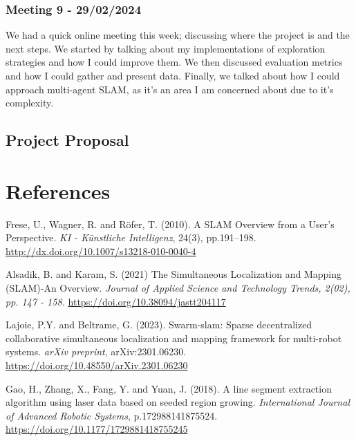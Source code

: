 \documentclass[12pt]{article}
\begin{document}
\subsubsection{Meeting 9 - 29/02/2024}
We had a quick online meeting this week; discussing where the project is and the next steps. We started by talking about
my implementations of exploration strategies and how I could improve them. We then discussed evaluation metrics and how I
could gather and present data. Finally, we talked about how I could approach multi-agent SLAM, as it's an area I am concerned
about due to it's complexity.

\subsection{Project Proposal}


\section{References}

\begin{thebibliography}{9}

    Frese, U., Wagner, R. and Röfer, T. (2010). A SLAM Overview from a User’s Perspective.
    \textit{KI - Künstliche Intelligenz}, 24(3), pp.191–198.
    \href{http://dx.doi.org/10.1007/s13218-010-0040-4}{http://dx.doi.org/10.1007/s13218-010-0040-4}

    Alsadik, B. and Karam, S. (2021) The Simultaneous Localization and Mapping (SLAM)-An Overview.
    \textit{Journal of Applied Science and Technology Trends, 2(02), pp. 147 - 158.}
    \href{https://doi.org/10.38094/jastt204117}{https://doi.org/10.38094/jastt204117}

    Lajoie, P.Y. and Beltrame, G. (2023). Swarm-slam: Sparse decentralized collaborative simultaneous localization and mapping framework for multi-robot systems.
    \textit{arXiv preprint},  arXiv:2301.06230.
    \href{https://doi.org/10.48550/arXiv.2301.06230}{https://doi.org/10.48550/arXiv.2301.06230}

    Gao, H., Zhang, X., Fang, Y. and Yuan, J. (2018). A line segment extraction algorithm using laser data based on seeded region growing.
    \textit{ International Journal of Advanced Robotic Systems}, p.172988141875524.
    \href{https://doi.org/10.1177/1729881418755245}{https://doi.org/10.1177/1729881418755245}

\end{thebibliography}
\end{document}
